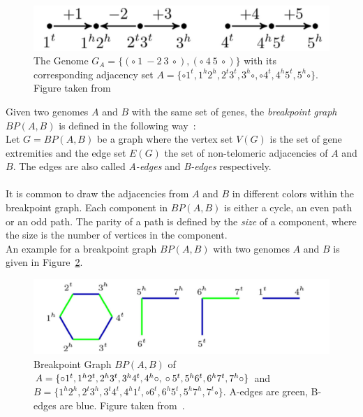 \begin{figure}[h]
	\centering
	\includegraphics[scale=0.4]{figures/genomeRep.png}
	\caption{%
	 The Genome $G_A=\{(\circ\ 1\ -2\ 3\ \circ),(\circ\ 4\ 5\ \circ)\}$ with its corresponding adjacency set 
	 $A=\{\circ 1^t, 1^h2^h, 2^t3^t, 3^h\circ, \circ 4^t, 4^h5^t, 5^h\circ\}$.  
	 Figure taken from~\cite{Feijao2015}
		}%
	\label{fig:genomeRep}
\end{figure}
\noindent
Given two genomes $A$ and $B$ with the same set of genes, the \emph{breakpoint graph} $BP(A,B)$ is defined in the following way~\cite{Tannier2009}:\\
Let $G=BP(A,B)$ be a graph where the vertex set $V(G)$ is the set of gene extremities and the edge set $E(G)$ the set of non-telomeric
adjacencies of $A$ and $B$.
The edges are also called \emph{A-edges} and \emph{B-edges} respectively. \\ \ \\
It is common to draw the adjacencies from $A$ and $B$ in different colors within the breakpoint graph.
Each component in $BP(A,B)$ is either a cycle, an even path or an odd path.
The parity of a path is defined by the \emph{size} of a component, where the size is the number of vertices in the component.\\
An example for a breakpoint graph $BP(A,B)$ with two genomes $A$ and $B$ is given in Figure~\ref{fig:BPgraph}.

\begin{figure}[h]
	\centering
	\includegraphics[scale=0.5]{figures/BPG_1.png}
	\caption{%
		Breakpoint Graph $BP(A,B)$ of $A=\{\circ 1^t,1^h2^t,2^h3^t,3^h4^t,4^h\circ,\\\circ 5^t,5^h6^t,6^h7^t,7^h\circ\}$ and 
		$B=\{1^h2^h,2^t3^h,3^t4^t,4^h1^t,\circ 6^t,6^h5^t,5^h7^h,7^t\circ\}$.
		A-edges are green, B-edges are blue. Figure taken from~\cite{Feijao2015}.
	}%
	\label{fig:BPgraph}
\end{figure}


